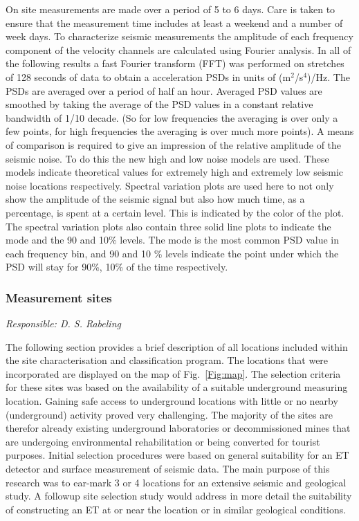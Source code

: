 On site measurements are made over a period of 5 to 6 days. Care is taken to ensure that the measurement time includes at least a weekend and a number of week days. To characterize seismic measurements the amplitude of each frequency component of the velocity channels are calculated using Fourier analysis. In all of the following results a fast Fourier transform (FFT) was performed on stretches of 128 seconds of data to obtain a acceleration PSDs in units of (m$^2$/s$^4$)/Hz. The PSDs are averaged over a period of half an hour. Averaged PSD values are smoothed by taking the average of the PSD values in a constant relative bandwidth of 1/10 decade. (So for low frequencies the averaging is over only a few points, for high frequencies the averaging is over much more points). A means of comparison is required to give an impression of the relative amplitude of the seismic noise. To do this the new high and low noise models are used. These models indicate theoretical values for extremely high and extremely low seismic noise locations respectively. Spectral variation plots are used here to not only show the amplitude of the seismic signal but also how much time, as a percentage, is spent at a certain level. This is indicated by the color of the plot. The spectral variation plots also contain three solid line plots to indicate the mode and the 90 and 10\% levels. The mode is the most common PSD value in each frequency bin, and 90 and 10 \% levels indicate the point under which the PSD will stay for 90\%, 10\% of the time respectively. 
\FloatBarrier
\FloatBarrier
\subsubsection{Measurement sites}
\emph{
Responsible:  D. S. Rabeling  \\
}

The following section provides a brief description of all locations included within the site characterisation and classification program. The locations that were incorporated are displayed on the map of Fig.~\ref{Fig:map}. The selection criteria for these sites was based on the availability of a suitable underground measuring location. Gaining safe access to underground locations with little or no nearby (underground) activity proved very challenging. The majority of the sites are therefor already existing underground laboratories or decommissioned mines that are undergoing environmental rehabilitation or being converted for tourist purposes. Initial selection procedures were based on general suitability for an ET detector and surface measurement of seismic data. The main purpose of this research was to ear-mark 3 or 4 locations for an extensive seismic and geological study. A followup site selection study would address in more detail the suitability of constructing an ET at or near the location or in similar geological conditions.  


